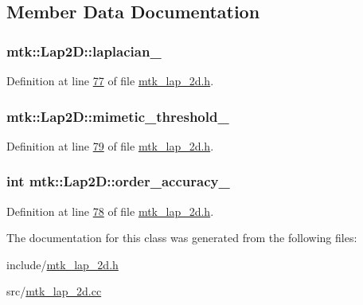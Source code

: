 \subsection{Member Data Documentation}
\hypertarget{classmtk_1_1Lap2D_a6c52889838324a89f85ed37bd3bf44f4}{
\subsubsection[{laplacian\-\_\-}]{ mtk\-::\-Lap2\-D\-::laplacian\-\_\-\hspace{0.3cm}{\ttfamily [private]}}}\label{classmtk_1_1Lap2D_a6c52889838324a89f85ed37bd3bf44f4}


Definition at line \hyperlink{mtk__lap__2d_8h_source_l00077}{77} of file \hyperlink{mtk__lap__2d_8h_source}{mtk\-\_\-lap\-\_\-2d.\-h}.

\hypertarget{classmtk_1_1Lap2D_a5501bd196f7307f64d6fa58da070196e}{
\subsubsection[{mimetic\-\_\-threshold\-\_\-}]{ mtk\-::\-Lap2\-D\-::mimetic\-\_\-threshold\-\_\-\hspace{0.3cm}{\ttfamily [private]}}}\label{classmtk_1_1Lap2D_a5501bd196f7307f64d6fa58da070196e}


Definition at line \hyperlink{mtk__lap__2d_8h_source_l00079}{79} of file \hyperlink{mtk__lap__2d_8h_source}{mtk\-\_\-lap\-\_\-2d.\-h}.

\hypertarget{classmtk_1_1Lap2D_a9c4fdfe20a093b19f3b3f7ff0c49f560}{
\subsubsection[{order\-\_\-accuracy\-\_\-}]{\setlength{\rightskip}{0pt plus 5cm}int mtk\-::\-Lap2\-D\-::order\-\_\-accuracy\-\_\-\hspace{0.3cm}{\ttfamily [private]}}}\label{classmtk_1_1Lap2D_a9c4fdfe20a093b19f3b3f7ff0c49f560}


Definition at line \hyperlink{mtk__lap__2d_8h_source_l00078}{78} of file \hyperlink{mtk__lap__2d_8h_source}{mtk\-\_\-lap\-\_\-2d.\-h}.



The documentation for this class was generated from the following files\-:\begin{DoxyCompactItemize}
\item 
include/\hyperlink{mtk__lap__2d_8h}{mtk\-\_\-lap\-\_\-2d.\-h}\item 
src/\hyperlink{mtk__lap__2d_8cc}{mtk\-\_\-lap\-\_\-2d.\-cc}\end{DoxyCompactItemize}
